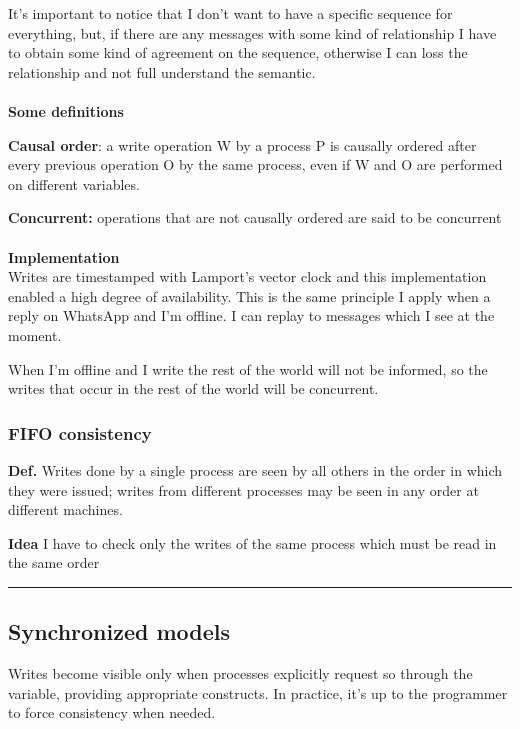 It's important to notice that I don't want to have a specific sequence for everything, but,
if there are any messages with some kind of relationship I have to
obtain some kind of agreement on the sequence, otherwise I can loss the
relationship and not full understand the semantic.\\
\\
\textbf{Some definitions}

\textbf{Causal order}: a write operation W by a process P is causally
ordered after every previous operation O by the same process, even if W
and O are performed on different variables.

\textbf{Concurrent:} operations that are not causally ordered are said
to be concurrent\\
\\
\textbf{Implementation}\\
Writes are timestamped with Lamport's vector
clock and this implementation enabled a high degree of availability.
This is the same principle I apply when a reply on WhatsApp and I'm
offline. I can replay to messages which I see at the moment.

When I'm offline and I write the rest of the world will not be informed,
so the writes that occur in the rest of the world will be concurrent.

\subsubsection{FIFO consistency}

\textbf{Def.} Writes done by a single process are seen by all others in
the order in which they were issued; writes from different processes may
be seen in any order at different machines.

\textbf{Idea} I have to check only the writes of the same process which
must be read in the same order

\begin{center}\rule{3in}{0.4pt}\end{center}

\subsection{Synchronized models}

Writes become visible only when processes explicitly request so through
the variable, providing appropriate constructs. In practice, it's up to
the programmer to force consistency when needed.

